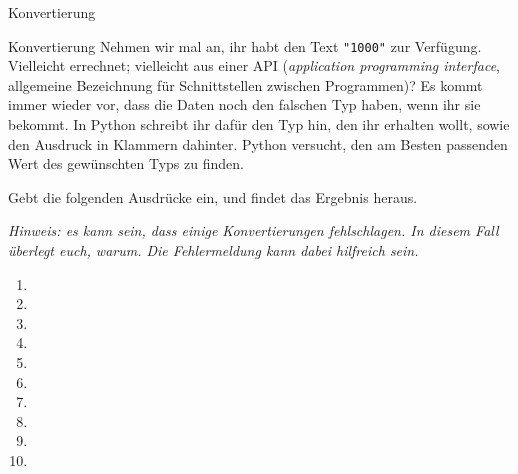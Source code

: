 \begin{task}[points=auto]{Konvertierung }
    \begin{subtask*}[points=0]{Konvertierung}
        Nehmen wir mal an, ihr habt den Text \texttt{"1000"} zur Verfügung. Vielleicht
        errechnet; vielleicht aus einer API (\textit{application programming interface}, allgemeine Bezeichnung für Schnittstellen zwischen Programmen)? Es kommt immer wieder vor, dass die Daten noch den falschen Typ haben, wenn ihr sie bekommt. In Python schreibt ihr dafür
        den Typ hin, den ihr erhalten wollt, sowie den Ausdruck in Klammern dahinter.
        Python versucht, den am Besten passenden Wert des gewünschten Typs zu finden.

        Gebt die folgenden Ausdrücke ein, und findet das Ergebnis heraus.

        \textit{Hinweis: es kann sein, dass einige Konvertierungen fehlschlagen. In diesem Fall überlegt euch, warum. Die Fehlermeldung kann dabei hilfreich sein.}

        \begin{multicols}{3}
            \begin{enumerate}
                \item {}
                \item {}
                \item {}
                \item {}
                \item {}
                \item {}
                \item {}
                \item {}
                \item {}
                \item {}
            \end{enumerate}
        \end{multicols}


\end{subtask*}
\end{task}

